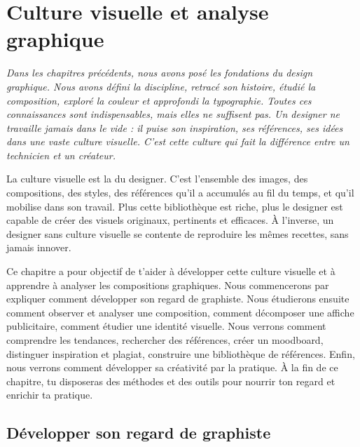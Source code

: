 
\chapter{Culture visuelle et analyse graphique}

\noindent
\textit{Dans les chapitres précédents, nous avons posé les fondations du design graphique. Nous avons défini la discipline, retracé son histoire, étudié la composition, exploré la couleur et approfondi la typographie. Toutes ces connaissances sont indispensables, mais elles ne suffisent pas. Un designer ne travaille jamais dans le vide : il puise son inspiration, ses références, ses idées dans une vaste culture visuelle. C'est cette culture qui fait la différence entre un technicien et un créateur.}

\vspace{1em}

\noindent
La culture visuelle est la  du designer. C'est l'ensemble des images, des compositions, des styles, des références qu'il a accumulés au fil du temps, et qu'il mobilise dans son travail. Plus cette bibliothèque est riche, plus le designer est capable de créer des visuels originaux, pertinents et efficaces. À l'inverse, un designer sans culture visuelle se contente de reproduire les mêmes recettes, sans jamais innover.

\vspace{1em}

\noindent
Ce chapitre a pour objectif de t'aider à développer cette culture visuelle et à apprendre à analyser les compositions graphiques. Nous commencerons par expliquer comment développer son regard de graphiste. Nous étudierons ensuite comment observer et analyser une composition, comment décomposer une affiche publicitaire, comment étudier une identité visuelle. Nous verrons comment comprendre les tendances, rechercher des références, créer un moodboard, distinguer inspiration et plagiat, construire une bibliothèque de références. Enfin, nous verrons comment développer sa créativité par la pratique. À la fin de ce chapitre, tu disposeras des méthodes et des outils pour nourrir ton regard et enrichir ta pratique.

\section{Développer son regard de graphiste}

